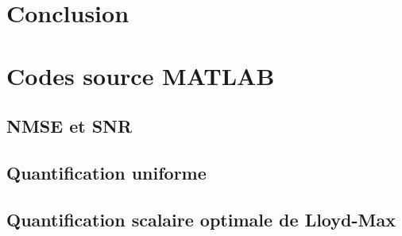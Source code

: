 \documentclass[a4paper, 12pt]{article}
\newcommand{\FSource}[1]{%

}
\begin{document}
\newpage

\section{Conclusion}


\clearpage
\appendix

\section{Codes source MATLAB}
\subsection{NMSE et SNR}\label{nmse_snr_code}

\FSource{../disto_1_1.m}

\newpage

\subsection{Quantification uniforme}\label{quant_uni_code}

\FSource{../quant_uni_1_2.m}

\newpage

\subsection{Quantification scalaire optimale de Lloyd-Max}\label{quant_lloyd}

\FSource{../lloyd_max_2_1.m}
\end{document}
